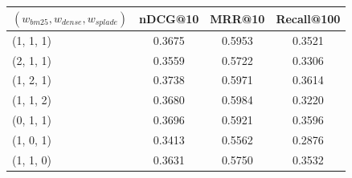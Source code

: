 \begin{tabular}{lccc}
\toprule
$(w_{bm25}, w_{dense}, w_{splade})$ & nDCG@10 & MRR@10 & Recall@100 \\
\midrule
(1, 1, 1) & 0.3675 & 0.5953 & 0.3521 \\
(2, 1, 1) & 0.3559 & 0.5722 & 0.3306 \\
(1, 2, 1) & 0.3738 & 0.5971 & 0.3614 \\
(1, 1, 2) & 0.3680 & 0.5984 & 0.3220 \\
(0, 1, 1) & 0.3696 & 0.5921 & 0.3596 \\
(1, 0, 1) & 0.3413 & 0.5562 & 0.2876 \\
(1, 1, 0) & 0.3631 & 0.5750 & 0.3532 \\
\bottomrule
\end{tabular}
